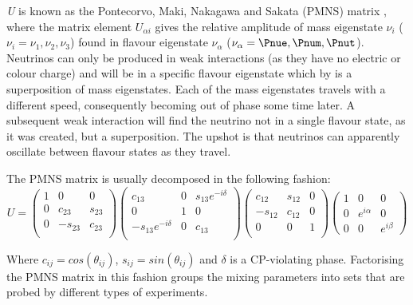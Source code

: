 \textit{U} is known as the Pontecorvo, Maki, Nakagawa and Sakata (PMNS) matrix \cite{1968JETP...26..984P} \cite{1962PThPh..28..870M}, where the matrix element $U_{\alpha i}$ gives the relative amplitude of mass eigenstate $\nu_{i}$ ($\nu_{i}=\nu_{1},\nu_{2},\nu_{3}$) found in flavour eigenstate $\nu_{\alpha}$ ($\nu_{\alpha}=\Pnue,\Pnum,\Pnut$). Neutrinos can only be produced in weak interactions (as they have no electric or colour charge) and will be in a specific flavour eigenstate which by  is a superposition of mass eigenstates. Each of the mass eigenstates travels with a different speed, consequently becoming out of phase some time later. A subsequent weak interaction will find the neutrino not in a single flavour state, as it was created, but a superposition. The upshot is that neutrinos can apparently oscillate between flavour states as they travel. 

The PMNS matrix is usually decomposed in the following fashion:
\begin{equation}
  U = 
  \begin{pmatrix}
    1 & 0 & 0 \\
    0 & c_{23} & s_{23} \\
    0 & -s_{23} & c_{23} \\
  \end{pmatrix}
  \begin{pmatrix}
    c_{13} & 0 & s_{13}e^{-i\delta} \\
    0 & 1 & 0 \\
    -s_{13}e^{-i\delta} & 0 & c_{13} \\
  \end{pmatrix}
  \begin{pmatrix}
    c_{12} & s_{12} & 0 \\
    -s_{12} & c_{12} & 0 \\
    0 & 0 & 1 \\
  \end{pmatrix}
  \begin{pmatrix}
    1 & 0 & 0 \\
    0 & e^{i\alpha} & 0 \\
    0 & 0 & e^{i\beta} 
  \end{pmatrix}
  \label{eq:particle-physics:pmns_matrix}
\end{equation}

\noindent
Where $c_{ij}=cos(\theta_{ij})$, $s_{ij}=sin(\theta_{ij})$ and $\delta$ is a CP-violating phase. Factorising the PMNS matrix in this fashion groups the mixing parameters into sets that are probed by different types of experiments. 

